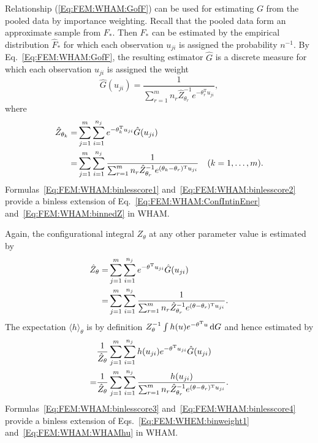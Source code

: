 Relationship (\ref{Eq:FEM:WHAM:GofF}) can be used for estimating $G$ from the pooled data by importance weighting. Recall that the pooled data form an approximate sample from $F_\ast$. Then $F_\ast$ can be estimated by the empirical distribution $\hat{F}_\ast$ for which each observation $u_{ji}$ is assigned the probability $n^{-1}$. By Eq.~\ref{Eq:FEM:WHAM:GofF}, the resulting estimator $\hat{G}$ is a discrete measure for which each observation $u_{ji}$ is assigned the weight
\begin{equation}
    \hat{G}(u_{ji})=\frac{1}{\sum_{r=1}^m n_r\hat{Z}_{\theta_r}^{-1}e^{-\theta_r^\mathrm{T}u_{ji}}},
    \label{Eq:FEM:WHAM:binlesscore1}
\end{equation}
where
\begin{align}
   \hat{Z}_{\theta_k}=&\sum_{j=1}^m \sum_{i=1}^{n_j}e^{-\theta_k^{\mathrm{T}}u_{ji}}\hat{G}(u_{ji})\notag\\
                     =&\sum_{j=1}^m \sum_{i=1}^{n_j}\frac{1}{\sum_{r=1}^m n_r\hat{Z}_{\theta_r}^{-1}e^{(\theta_k-\theta_r)^{\mathrm{T}}u_{ji}}}\quad (k=1,\dots,m).
   \label{Eq:FEM:WHAM:binlesscore2}
\end{align}
Formulas~\ref{Eq:FEM:WHAM:binlesscore1} and~\ref{Eq:FEM:WHAM:binlesscore2} provide a binless extension of Eq.~\ref{Eq:FEM:WHAM:ConfIntinEner} and~\ref{Eq:FEM:WHAM:binnedZ} in WHAM.

Again, the configurational integral $Z_\theta$ at any other parameter value is estimated by
\begin{align}
    \hat{Z}_{\theta}=&\sum_{j=1}^m \sum_{i=1}^{n_j}e^{-\theta^{\mathrm{T}}u_{ji}}\hat{G}(u_{ji})\notag\\
    =&\sum_{j=1}^m \sum_{i=1}^{n_j}\frac{1}{\sum_{r=1}^m n_r\hat{Z}_{\theta_r}^{-1}e^{(\theta-\theta_r)^{\mathrm{T}}u_{ji}}}.
    \label{Eq:FEM:WHAM:binlesscore3}
\end{align}
The expectation $\langle h\rangle_\theta$ is by definition $Z_\theta^{-1}\int h(u)e^{-\theta^\mathrm{T}u}\mathop{}\!\mathrm{d} G$ and hence estimated by
\begin{align}
    &\frac{1}{\hat{Z}_\theta}\sum_{j=1}^m\sum_{i=1}^{n_j}h(u_{ji})e^{-\theta^\mathrm{T}u_{ji}}\hat{G}(u_{ji})\notag\\
    =&\frac{1}{\hat{Z}_\theta}\sum_{j=1}^m \sum_{i=1}^{n_j}\frac{h(u_{ji})}{\sum_{r=1}^m n_r\hat{Z}_{\theta_r}^{-1}e^{(\theta-\theta_r)^{\mathrm{T}}u_{ji}}}.
    \label{Eq:FEM:WHAM:binlesscore4}
\end{align}
Formulas~\ref{Eq:FEM:WHAM:binlesscore3} and~\ref{Eq:FEM:WHAM:binlesscore4} provide a binless extension of Eqs.~\ref{Eq:FEM:WHEM:binweight1} and~\ref{Eq:FEM:WHAM:WHAMhu} in WHAM.